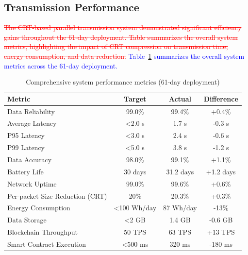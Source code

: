 \documentclass[pdflatex,sn-mathphys-num]{sn-jnl}
\theoremstyle{thmstyleone}
\theoremstyle{thmstyletwo}
\theoremstyle{thmstylethree}
\begin{document}
{\subsection{Transmission Performance}
\label{subsec:transmission_performance}

\textcolor{red}{\sout{The CRT-based parallel transmission system demonstrated significant efficiency gains throughout the 61‑day deployment. Table summarizes the overall system metrics, highlighting the impact of CRT compression on transmission time, energy consumption, and data reduction.}}
\textcolor{blue}{Table~\ref{tab:system-performance} summarizes the overall system metrics across the 61-day deployment.}

\begin{table}[htbp]
\centering
\caption{Comprehensive system performance metrics (61-day deployment)}
\label{tab:system-performance}
\scriptsize
\begin{tabularx}{\columnwidth}{lccc}
\toprule
\textbf{Metric} & \textbf{Target} & \textbf{Actual} & \textbf{Difference} \\
\midrule
Data Reliability & 99.0\% & 99.4\% & +0.4\% \\
Average Latency & <2.0 s & 1.7 s & -0.3 s \\
P95 Latency & <3.0 s & 2.4 s & -0.6 s \\
P99 Latency & <5.0 s & 3.8 s & -1.2 s \\
Data Accuracy & 98.0\% & 99.1\% & +1.1\% \\
Battery Life & 30 days & 31.2 days & +1.2 days \\
Network Uptime & 99.0\% & 99.6\% & +0.6\% \\
Per-packet Size Reduction (CRT) & 20\% & 20.3\% & +0.3\% \\
Energy Consumption & <100 Wh/day & 87 Wh/day & -13\% \\
Data Storage & <2 GB & 1.4 GB & -0.6 GB \\
Blockchain Throughput & 50 TPS & 63 TPS & +13 TPS \\
Smart Contract Execution & <500 ms & 320 ms & -180 ms \\
\bottomrule
\end{tabularx}
\end{table}

}
\end{document}

